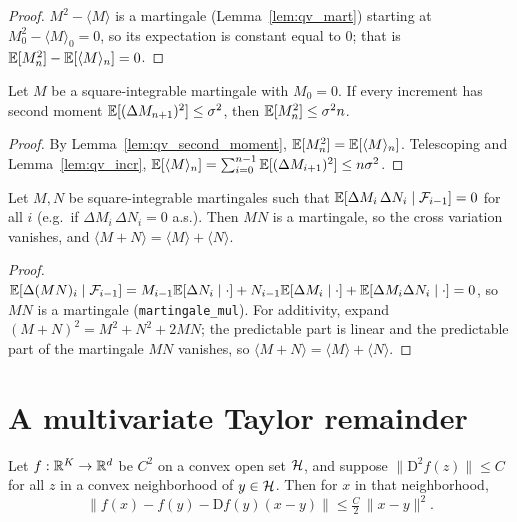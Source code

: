 \begin{proof}\leanok
$M^2 - \langle M\rangle$ is a martingale (Lemma~\ref{lem:qv_mart}) starting at
$M_0^2 - \langle M\rangle_0 = 0$, so its expectation is constant equal to $0$;
that is $\mathbb{E}[M_n^2] - \mathbb{E}[\langle M\rangle_n] = 0$.
\end{proof}

\begin{lemma}\label{lem:mart_sq_growth}
\leanok
{}
Let $M$ be a square-integrable martingale with $M_0 = 0$. If every increment has
second moment $\mathbb{E}[(\Delta M_{n+1})^2] \le \sigma^2$, then $\mathbb{E}[M_n^2] \le \sigma^2 n$.
\end{lemma}

\begin{proof}\leanok
By Lemma~\ref{lem:qv_second_moment}, $\mathbb{E}[M_n^2] = \mathbb{E}[\langle M\rangle_n]$.
Telescoping and Lemma~\ref{lem:qv_incr},
$\mathbb{E}[\langle M\rangle_n] = \sum_{i=0}^{n-1}\mathbb{E}[(\Delta M_{i+1})^2] \le n\sigma^2$.
\end{proof}

\begin{lemma}\label{lem:qv_orthogonal}
\leanok
{}
Let $M, N$ be square-integrable martingales such that
$\mathbb{E}[\Delta M_i\, \Delta N_i \mid \mathcal{F}_{i-1}] = 0$ for all $i$ (e.g.\ if
$\Delta M_i\, \Delta N_i = 0$ a.s.). Then $MN$ is a martingale, so the cross
variation vanishes, and $\langle M + N\rangle = \langle M\rangle + \langle N\rangle$.
\end{lemma}

\begin{proof}\leanok
$\mathbb{E}[\Delta(MN)_i\mid\mathcal{F}_{i-1}] = M_{i-1}\mathbb{E}[\Delta N_i\mid\cdot]
+ N_{i-1}\mathbb{E}[\Delta M_i\mid\cdot] + \mathbb{E}[\Delta M_i\Delta N_i\mid\cdot] = 0$, so $MN$
is a martingale (\texttt{martingale\_mul}). For additivity, expand
$(M+N)^2 = M^2 + N^2 + 2MN$; the predictable part is linear and the predictable
part of the martingale $MN$ vanishes, so
$\langle M+N\rangle = \langle M\rangle + \langle N\rangle$.
\end{proof}

\section{A multivariate Taylor remainder}
\label{sec:pre_taylor}

\begin{lemma}\label{lem:taylor_first_order}
\leanok
Let $f : \mathbb{R}^K \to \mathbb{R}^d$ be $C^2$ on a convex open set $\mathcal{H}$, and suppose
$\|\mathrm{D}^2 f(z)\| \le C$ for all $z$ in a convex neighborhood of $y \in \mathcal{H}$.
Then for $x$ in that neighborhood,
\[
  \big\| f(x) - f(y) - \mathrm{D}f(y)(x - y) \big\| \le \tfrac{C}{2}\,\|x - y\|^2.
\]
\end{lemma}

